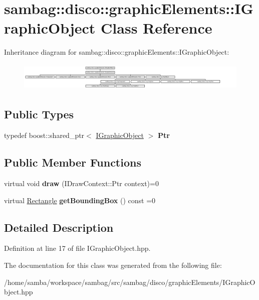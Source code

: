 \hypertarget{classsambag_1_1disco_1_1graphic_elements_1_1_i_graphic_object}{
\section{sambag::disco::graphicElements::IGraphicObject Class Reference}
\label{classsambag_1_1disco_1_1graphic_elements_1_1_i_graphic_object}
}
Inheritance diagram for sambag::disco::graphicElements::IGraphicObject:\begin{figure}[H]
\begin{center}
\leavevmode
\includegraphics[height=1.365188cm]{classsambag_1_1disco_1_1graphic_elements_1_1_i_graphic_object}
\end{center}
\end{figure}
\subsection*{Public Types}
\begin{DoxyCompactItemize}
\item 
\hypertarget{classsambag_1_1disco_1_1graphic_elements_1_1_i_graphic_object_a8e99161cf5d50d87bc975700187f2165}{
typedef boost::shared\_\-ptr$<$ \hyperlink{classsambag_1_1disco_1_1graphic_elements_1_1_i_graphic_object}{IGraphicObject} $>$ {\bfseries Ptr}}
\label{classsambag_1_1disco_1_1graphic_elements_1_1_i_graphic_object_a8e99161cf5d50d87bc975700187f2165}

\end{DoxyCompactItemize}
\subsection*{Public Member Functions}
\begin{DoxyCompactItemize}
\item 
\hypertarget{classsambag_1_1disco_1_1graphic_elements_1_1_i_graphic_object_aa1b0a1f97cc91380250083cdc52d7a15}{
virtual void {\bfseries draw} (IDrawContext::Ptr context)=0}
\label{classsambag_1_1disco_1_1graphic_elements_1_1_i_graphic_object_aa1b0a1f97cc91380250083cdc52d7a15}

\item 
\hypertarget{classsambag_1_1disco_1_1graphic_elements_1_1_i_graphic_object_ad25ba2dcecb8dce0daaff9e36f90cad9}{
virtual \hyperlink{classsambag_1_1com_1_1_rectangle}{Rectangle} {\bfseries getBoundingBox} () const =0}
\label{classsambag_1_1disco_1_1graphic_elements_1_1_i_graphic_object_ad25ba2dcecb8dce0daaff9e36f90cad9}

\end{DoxyCompactItemize}


\subsection{Detailed Description}


Definition at line 17 of file IGraphicObject.hpp.



The documentation for this class was generated from the following file:\begin{DoxyCompactItemize}
\item 
/home/samba/workspace/sambag/src/sambag/disco/graphicElements/IGraphicObject.hpp\end{DoxyCompactItemize}
